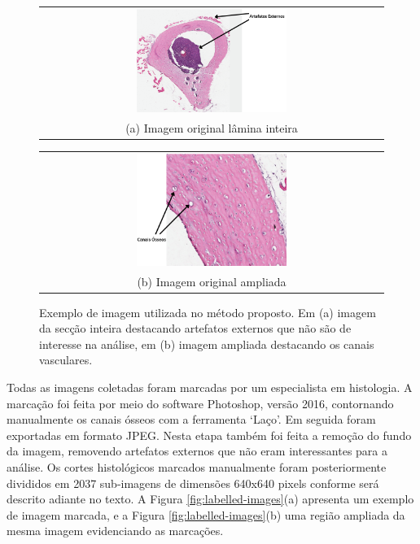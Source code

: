 \begin{figure}[h]
    \center
    \begin{tabular}{@{}c@{}}
        \includegraphics[width=0.45\textwidth]{figures/3_methods/imagem_original_inteira.png}
        \\[\abovecaptionskip]
    \small (a) Imagem original lâmina inteira
    \end{tabular}
    \begin{tabular}{@{}c@{}}
        \includegraphics[width=0.45\textwidth]{figures/3_methods/imagem_original_ampliada.png}
        \\[\abovecaptionskip]
    \small (b) Imagem original ampliada
    \end{tabular}
    
    \caption[Exemplo de imagem utilizada no método proposto.]{Exemplo de imagem utilizada no método proposto. Em (a) imagem da secção inteira destacando artefatos externos que não são de interesse na análise, em (b) imagem ampliada destacando os canais vasculares.} 
    \label{fig:original-images}
\end{figure}

Todas as imagens coletadas foram marcadas por um especialista em histologia. A marcação foi feita por meio do software Photoshop\textregistered, versão 2016, contornando manualmente os canais ósseos com a ferramenta `Laço'. Em seguida foram exportadas em formato JPEG. Nesta etapa também foi feita a remoção do fundo da imagem, removendo artefatos externos que não eram interessantes para a análise. Os cortes histológicos marcados manualmente foram posteriormente divididos em 2037 sub-imagens de dimensões 640x640 pixels conforme será descrito adiante no texto.
A Figura \ref{fig:labelled-images}(a) apresenta um exemplo de imagem marcada, e a Figura \ref{fig:labelled-images}(b) uma região ampliada da mesma imagem evidenciando as marcações. 

